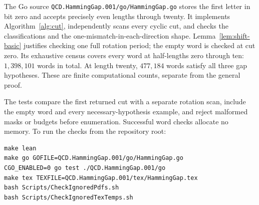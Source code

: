 \documentclass[11pt,letterpaper]{article}
\begin{document}
The Go source \texttt{QCD.HammingGap.001/go/HammingGap.go} stores the first
letter in bit zero and accepts precisely even lengths through twenty. It
implements Algorithm~\ref{alg:cut}, independently scans every cyclic cut,
and checks the classifications and the one-mismatch-in-each-direction shape.
Lemma~\ref{lem:shift-basic} justifies checking one full rotation period;
the empty word is checked at cut zero.
Its exhaustive census covers every word at half-lengths zero through ten:
\(1{,}398{,}101\) words in total. At length twenty, \(477{,}184\) words satisfy
all three gap hypotheses. These are finite computational counts, separate
from the general proof.

The tests compare the first returned cut with a separate rotation scan,
include the empty word and every necessary-hypothesis example, and reject
malformed masks or budgets before enumeration. Successful word checks
allocate no memory. To run the checks from the repository root:
\begin{verbatim}
make lean
make go GOFILE=QCD.HammingGap.001/go/HammingGap.go
CGO_ENABLED=0 go test ./QCD.HammingGap.001/go
make tex TEXFILE=QCD.HammingGap.001/tex/HammingGap.tex
bash Scripts/CheckIgnoredPdfs.sh
bash Scripts/CheckIgnoredTexTemps.sh
\end{verbatim}
\end{document}
